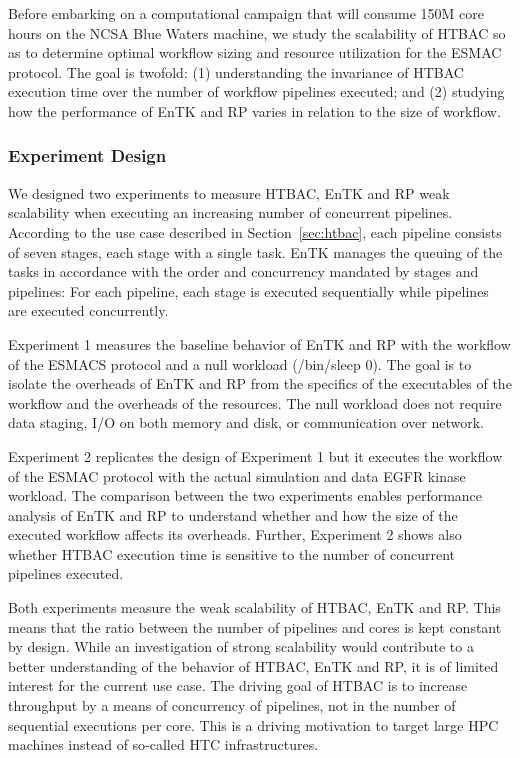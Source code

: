 
Before embarking on a computational campaign that will consume 150M core
hours on the NCSA Blue Waters machine, we study the scalability of HTBAC so
as to determine optimal workflow sizing and resource utilization for the
ESMAC protocol. The goal is twofold: (1) understanding the invariance of
HTBAC execution time over the number of workflow pipelines executed; and (2)
studying how the performance of EnTK and RP varies in relation to the size of
workflow.

\subsubsection{Experiment Design}\label{ssec:exp_design}

We designed two experiments to measure HTBAC, EnTK and RP weak scalability
when executing an increasing number of concurrent pipelines. According to the
use case described in Section~\ref{sec:htbac}, each pipeline consists of
seven stages, each stage with a single task. EnTK manages the queuing of the
tasks in accordance with the order and concurrency mandated by stages and
pipelines: For each pipeline, each stage is executed sequentially while
pipelines are executed concurrently.

Experiment 1 measures the baseline behavior of EnTK and RP with the workflow
of the ESMACS protocol and a null workload (\textmd{/bin/sleep 0}). The goal
is to isolate the overheads of EnTK and RP from the specifics of the
executables of the workflow and the overheads of the resources. The null
workload does not require data staging, I/O on both memory and disk, or
communication over network.

Experiment 2 replicates the design of Experiment 1 but it executes the
workflow of the ESMAC protocol with the actual simulation and data EGFR
kinase workload. The comparison between the two experiments enables
performance analysis of EnTK and RP to understand whether and how the size of
the executed workflow affects its overheads. Further, Experiment 2 shows also
whether HTBAC execution time is sensitive to the number of concurrent
pipelines executed.

Both experiments measure the weak scalability of HTBAC, EnTK and RP\@. This
means that the ratio between the number of pipelines and cores is kept
constant by design. While an investigation of strong scalability would
contribute to a better understanding of the behavior of HTBAC, EnTK and RP,
it is of limited interest for the current use case. The driving goal of HTBAC
is to increase throughput by a means of concurrency of pipelines, not in the
number of sequential executions per core. This is a driving motivation to
target large HPC machines instead of so-called HTC infrastructures.

